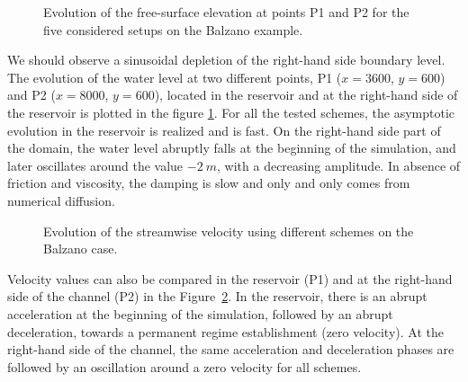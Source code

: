 \begin{figure}[H]
\begin{minipage}[t]{0.5\textwidth}
 \centering
\end{minipage}%
\begin{minipage}[t]{0.5\textwidth}
 \centering
\end{minipage}
\caption{Evolution of the free-surface elevation at points P1 and P2 for the five considered setups on the Balzano example.}
\label{fig:balzano:temporalSL}
\end{figure}

We should observe a sinusoidal depletion of the right-hand side boundary level.
The evolution of the water level at two different points, P1 ($x=3600$, $y=600$) and P2 ($x=8000$, $y=600$), located in the reservoir and at the right-hand side of the reservoir is plotted in the figure \ref{fig:balzano:temporalSL}.
For all the tested schemes, the asymptotic evolution in the reservoir is realized and is fast.
On the right-hand side part of the domain, the water level abruptly falls at the beginning of
the simulation, and later oscillates around the value $-2~m$,
with a decreasing amplitude. In absence of friction and viscosity, the damping is slow and only
and only comes from numerical diffusion.

\begin{figure}[H]
\begin{minipage}[t]{0.5\textwidth}
 \centering
\end{minipage}%
\begin{minipage}[t]{0.5\textwidth}
 \centering
\end{minipage}
\caption{Evolution of the streamwise velocity using different schemes on the Balzano case.}
\label{fig:balzano:temporalU}
\end{figure}

Velocity values can also be compared in the reservoir (P1) and at the right-hand side of the channel (P2) in the Figure~\ref{fig:balzano:temporalU}.
In the reservoir, there is an abrupt acceleration at the beginning of the simulation, followed by an
abrupt deceleration, towards a permanent regime establishment (zero velocity).
At the right-hand side of the channel, the same acceleration and deceleration
phases are followed by an oscillation around a zero velocity for all schemes.

